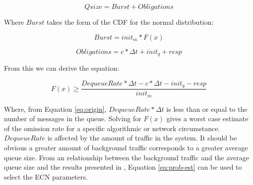 \begin{equation}
Qsize = Burst + Obligations
\end{equation}

Where $Burst$ takes the form of the \ac{CDF} for the normal distribution:

\begin{equation}
Burst = init_m * F(x)  
\end{equation}

\begin{equation}
Obligations = c * \Delta t + init_q + resp
\end{equation}

From this we can derive the equation:

\begin{equation}
F(x) \geq \frac{DequeueRate * \Delta t - c * \Delta t - init_q - resp}{init_m}
\label{eq:prob-est}
\end{equation}

Where, from Equation \ref{eq:origin}, $DequeueRate * \Delta t$ is less than or equal to the number of messages in the queue. 
Solving for $F(x)$ gives a worst case estimate of the omission rate for a specific algorithmic or network circumstance.
$DequeueRate$ is affected by the amount of traffic in the system. 
It should be obvious a greater amount of background traffic corresponds to a greater average queue size.
From an relationship between the background traffic and the average queue size and the results presented in \cite{JOURNALANON}, Equation \ref{eq:prob-est} can be used to select the ECN parameters.
